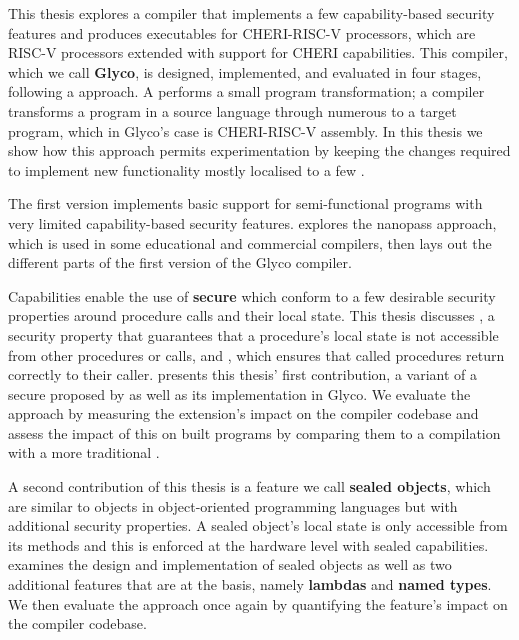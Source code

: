 \documentclass[main.tex]{subfiles}
\begin{document}
This thesis explores a compiler that implements a few capability-based security features and produces executables for CHERI-RISC-V processors, which are RISC-V processors extended with support for CHERI capabilities. This compiler, which we call \textbf{Glyco}, is designed, implemented, and evaluated in four stages, following a  approach. A  performs a small program transformation; a  compiler transforms a program in a source language through numerous  to a target program, which in Glyco's case is CHERI-RISC-V assembly. In this thesis we show how this approach permits experimentation by keeping the changes required to implement new functionality mostly localised to a few .

The first version implements basic support for semi-functional programs with very limited capability-based security features.  explores the nanopass approach, which is used in some educational and commercial compilers, then lays out the different parts of the first version of the Glyco compiler.

Capabilities enable the use of \textbf{secure } which conform to a few desirable security properties around procedure calls and their local state. This thesis discusses \emph{}, a security property that guarantees that a procedure's local state is not accessible from other procedures or calls, and \emph{}, which ensures that called procedures return correctly to their caller.  presents this thesis' first contribution, a variant of a secure  proposed by \citet{cerise} as well as its implementation in Glyco. We evaluate the  approach by measuring the extension's impact on the compiler codebase and assess the impact of this  on built programs by comparing them to a compilation with a more traditional .

A second contribution of this thesis is a feature we call \textbf{sealed objects}, which are similar to objects in object-oriented programming languages but with additional security properties. A sealed object's local state is only accessible from its methods and this is enforced at the hardware level with sealed capabilities.  examines the design and implementation of sealed objects as well as two additional features that are at the basis, namely \textbf{lambdas} and \textbf{named types}. We then evaluate the  approach once again by quantifying the feature's impact on the compiler codebase.
\end{document}
